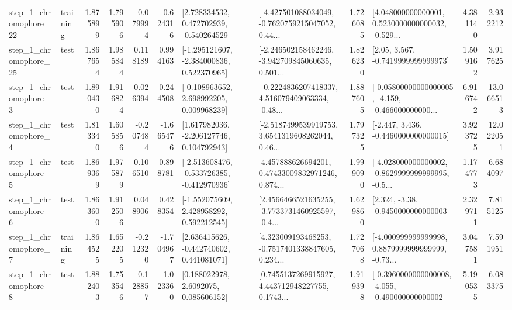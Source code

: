 \begin{tabular}{llrrrrllrlrr}
    step\_1\_chromophore\_22 &  training &      1.875899 &    1.795906 &     -0.079994 & -0.624316 &    [2.728334532, 0.472702939, -0.540264529] &  [-4.427501088034049, -0.7620759215047052, 0.44... &       1.726085 &  [4.048000000000001, 0.5230000000000032, -0.529... &            4.381140 &          2.932212 \\
    step\_1\_chromophore\_25 &      test &      1.867654 &    1.985844 &      0.118189 &  0.994163 &   [-1.295121607, -2.384000836, 0.522370965] &  [-2.246502158462246, -3.942709845060635, 0.501... &       1.826230 &                 [2.05, 3.567, -0.7419999999999973] &            1.509162 &          3.917625 \\
     step\_1\_chromophore\_3 &      test &      1.890430 &    1.916824 &      0.026394 &  0.244508 &    [-0.108963652, 2.698992205, 0.009968239] &  [-0.2224836207418337, 4.516079409063334, -0.48... &       1.887605 &  [-0.05800000000000005, -4.159, -0.466000000000... &            6.916742 &         13.066513 \\
     step\_1\_chromophore\_4 &      test &      1.813340 &    1.605856 &     -0.207484 & -1.665476 &    [1.617982036, -2.206127746, 0.104792943] &  [-2.5187499539919753, 3.6541319608262044, 0.46... &       1.797325 &               [-2.447, 3.436, -0.4460000000000015] &            3.923725 &         12.022051 \\
     step\_1\_chromophore\_5 &      test &      1.869369 &    1.975879 &      0.106510 &  0.898781 &  [-2.513608476, -0.533726385, -0.412970936] &  [4.457888626694201, 0.47433009832971246, 0.874... &       1.999090 &  [-4.028000000000002, -0.8629999999999995, -0.5... &            1.174773 &          6.684097 \\
     step\_1\_chromophore\_6 &      test &      1.863600 &    1.912506 &      0.048906 &  0.428354 &    [-1.552075609, 2.428958292, 0.592212545] &  [2.4566466521635255, -3.7733731460925597, -0.4... &       1.629860 &                [2.324, -3.38, -0.9450000000000003] &            2.329711 &          7.815125 \\
     step\_1\_chromophore\_7 &  training &      1.864525 &    1.652205 &     -0.212320 & -1.704967 &    [2.636415626, -0.442740602, 0.441081071] &  [4.323009193468253, -0.7517401338847605, 0.234... &       1.727068 &  [-4.000999999999998, 0.8879999999999999, -0.73... &            3.047581 &          7.591951 \\
     step\_1\_chromophore\_8 &      test &      1.882403 &    1.753546 &     -0.128857 & -1.023360 &       [0.188022978, 2.6092075, 0.085606152] &  [0.7455137269915927, 4.443712948227755, 0.1743... &       1.919398 &  [-0.3960000000000008, -4.055, -0.490000000000002] &            5.190535 &          6.083375 \\

\end{tabular}
